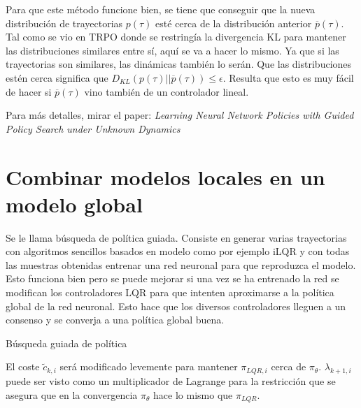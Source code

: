 Para que este método funcione bien, se tiene que conseguir que la nueva distribución de
trayectorias $p(\tau)$ esté cerca de la distribución anterior
$\overline{p}(\tau)$. Tal como se vio en TRPO donde se restringía la divergencia KL para
mantener las distribuciones similares entre sí, aquí se va a hacer lo mismo. Ya que si las
trayectorias son similares, las dinámicas también lo serán. Que las distribuciones estén
cerca significa que $D_{KL}(p(\tau)||\overline{p}(\tau))\leq\epsilon$. Resulta que esto es
muy fácil de hacer si $\overline{p}(\tau)$ vino también de un controlador lineal.

Para más detalles, mirar el paper: \textit{ Learning Neural Network Policies with Guided Policy Search under Unknown Dynamics }

\section{Combinar modelos locales en un modelo global}%
\label{sec:combinar_modelos_locales_en_un_modelo_global}

Se le llama búsqueda de política guiada. Consiste en generar varias trayectorias con
algoritmos sencillos basados en modelo como por ejemplo iLQR y con todas las muestras obtenidas
entrenar una red neuronal para que reproduzca el modelo. Esto funciona bien pero se puede mejorar
si una vez se ha entrenado la red se modifican los controladores LQR para que intenten
aproximarse a la política global de la red neuronal. Esto hace que los diversos
controladores lleguen a un consenso y se converja a una política global buena.

\begin{algorithm}
    \caption{Búsqueda guiada de política}
\end{algorithm}

El coste $\tilde{c}_{k,i}$ será modificado levemente para mantener $\pi_{LQR,i}$ cerca de
$\pi_\theta$. $\lambda_{k+1,i}$ puede ser visto como un multiplicador de Lagrange para la
restricción que se asegura que en la convergencia $\pi_\theta$ hace lo mismo que $\pi_{LQR}$.

